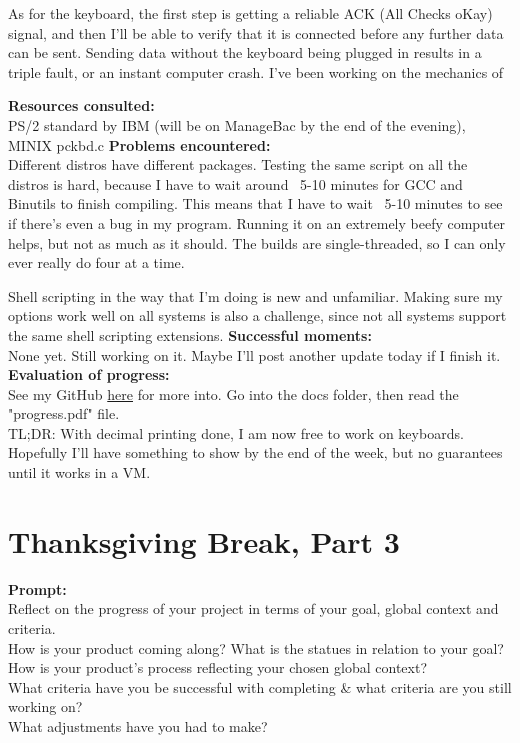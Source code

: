 \documentclass[11pt]{article}
\begin{document}
As for the keyboard, the first step is getting a reliable ACK (All Checks oKay) signal, and then I'll be able to verify that it is connected before any further data can be sent. Sending data without the keyboard being plugged in results in a triple fault, or an instant computer crash. I've been working on the mechanics of

\textbf{Resources consulted:}\\
PS/2 standard by IBM (will be on ManageBac by the end of the evening), MINIX pckbd.c
\textbf{Problems encountered:}\\
Different distros have different packages. Testing the same script on all the distros is hard, because I have to wait around ~5-10 minutes for GCC and Binutils to finish compiling. This means that I have to wait ~5-10 minutes to see if there's even a bug in my program. Running it on an extremely beefy computer helps, but not as much as it should. The builds are single-threaded, so I can only ever really do four at a time.

Shell scripting in the way that I'm doing is new and unfamiliar. Making sure my options work well on all systems is also a challenge, since not all systems support the same shell scripting extensions.
\textbf{Successful moments:}\\
None yet. Still working on it. Maybe I'll post another update today if I finish it.
\textbf{Evaluation of progress:}\\
See my GitHub \href{https://github.com/cats64/ibpersonalproject}{here} for more into. Go into the docs folder, then read the "progress.pdf" file.\\
TL;DR: With decimal printing done, I am now free to work on keyboards. Hopefully I'll have something to show by the end of the week, but no guarantees until it works in a VM.
\section{Thanksgiving Break, Part 3}
\textbf{Prompt:}\\
Reflect on the progress of your project in terms of your goal, global context and criteria.\\
How is your product coming along? What is the statues in relation to your goal?\\
How is your product’s process reflecting your chosen global context?\\
What criteria have you be successful with completing \& what criteria are you still working on?\\
What adjustments have you had to make?
\end{document}
